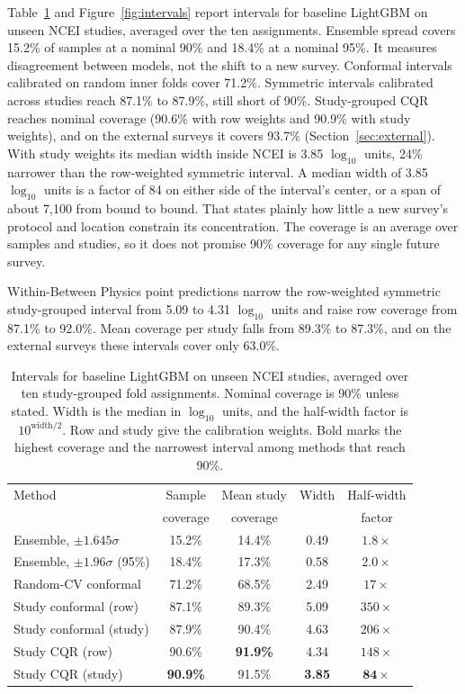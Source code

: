 \documentclass[12pt,a4paper]{report}
\begin{document}
Table~\ref{tab:intervals} and Figure~\ref{fig:intervals} report intervals for baseline LightGBM on unseen NCEI studies, averaged over the ten assignments. Ensemble spread covers 15.2\% of samples at a nominal 90\% and 18.4\% at a nominal 95\%. It measures disagreement between models, not the shift to a new survey. Conformal intervals calibrated on random inner folds cover 71.2\%. Symmetric intervals calibrated across studies reach 87.1\% to 87.9\%, still short of 90\%. Study-grouped CQR reaches nominal coverage (90.6\% with row weights and 90.9\% with study weights), and on the external surveys it covers 93.7\% (Section~\ref{sec:external}). With study weights its median width inside NCEI is 3.85 $\log_{10}$ units, 24\% narrower than the row-weighted symmetric interval. A median width of 3.85 $\log_{10}$ units is a factor of 84 on either side of the interval's center, or a span of about 7,100 from bound to bound. That states plainly how little a new survey's protocol and location constrain its concentration. The coverage is an average over samples and studies, so it does not promise 90\% coverage for any single future survey.

Within-Between Physics point predictions narrow the row-weighted symmetric study-grouped interval from 5.09 to 4.31 $\log_{10}$ units and raise row coverage from 87.1\% to 92.0\%. Mean coverage per study falls from 89.3\% to 87.3\%, and on the external surveys these intervals cover only 63.0\%.

\begin{table}[!htbp]
\centering
\caption[Prediction intervals for baseline LightGBM on unseen NCEI studies]{Intervals for baseline LightGBM on unseen NCEI studies, averaged over ten study-grouped fold assignments. Nominal coverage is 90\% unless stated. Width is the median in $\log_{10}$ units, and the half-width factor is $10^{\text{width}/2}$. Row and study give the calibration weights. Bold marks the highest coverage and the narrowest interval among methods that reach 90\%.}
\label{tab:intervals}
\setlength{\tabcolsep}{3pt}
\begin{tabular}{@{}lcccc@{}}
\toprule
Method & Sample & Mean study & Width & Half-width\\
 & coverage & coverage & & factor\\
\midrule
Ensemble, $\pm1.645\sigma$ & 15.2\% & 14.4\% & 0.49 & $1.8\times$\\
Ensemble, $\pm1.96\sigma$ (95\%) & 18.4\% & 17.3\% & 0.58 & $2.0\times$\\
Random-CV conformal & 71.2\% & 68.5\% & 2.49 & $17\times$\\
Study conformal (row) & 87.1\% & 89.3\% & 5.09 & $350\times$\\
Study conformal (study) & 87.9\% & 90.4\% & 4.63 & $206\times$\\
Study CQR (row) & 90.6\% & \textbf{91.9\%} & 4.34 & $148\times$\\
Study CQR (study) & \textbf{90.9\%} & 91.5\% & \textbf{3.85} & $\mathbf{84\times}$\\
\bottomrule
\end{tabular}
\end{table}
\end{document}

